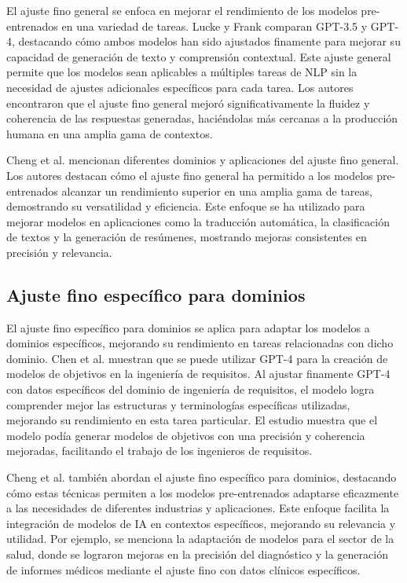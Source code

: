 El ajuste fino general se enfoca en mejorar el rendimiento de los modelos pre-entrenados en una variedad de tareas. Lucke y Frank \cite{Lucke2024} comparan GPT-3.5 y GPT-4, destacando cómo ambos modelos han sido ajustados finamente para mejorar su capacidad de generación de texto y comprensión contextual. Este ajuste general permite que los modelos sean aplicables a múltiples tareas de NLP sin la necesidad de ajustes adicionales específicos para cada tarea. Los autores encontraron que el ajuste fino general mejoró significativamente la fluidez y coherencia de las respuestas generadas, haciéndolas más cercanas a la producción humana en una amplia gama de contextos.

Cheng et al. \cite{Cheng2023} mencionan diferentes dominios y aplicaciones del ajuste fino general. Los autores destacan cómo el ajuste fino general ha permitido a los modelos pre-entrenados alcanzar un rendimiento superior en una amplia gama de tareas, demostrando su versatilidad y eficiencia. Este enfoque se ha utilizado para mejorar modelos en aplicaciones como la traducción automática, la clasificación de textos y la generación de resúmenes, mostrando mejoras consistentes en precisión y relevancia.

\subsection{Ajuste fino específico para dominios}

El ajuste fino específico para dominios se aplica para adaptar los modelos a dominios específicos, mejorando su rendimiento en tareas relacionadas con dicho dominio. Chen et al. \cite{Chen2023} muestran que  se puede utilizar GPT-4 para la creación de modelos de objetivos en la ingeniería de requisitos. Al ajustar finamente GPT-4 con datos específicos del dominio de ingeniería de requisitos, el modelo logra comprender mejor las estructuras y terminologías específicas utilizadas, mejorando su rendimiento en esta tarea particular. El estudio muestra que el modelo podía generar modelos de objetivos con una precisión y coherencia mejoradas, facilitando el trabajo de los ingenieros de requisitos.

Cheng et al. \cite{Cheng2023} también abordan el ajuste fino específico para dominios, destacando cómo estas técnicas permiten a los modelos pre-entrenados adaptarse eficazmente a las necesidades de diferentes industrias y aplicaciones. Este enfoque facilita la integración de modelos de IA en contextos específicos, mejorando su relevancia y utilidad. Por ejemplo, se menciona la adaptación de modelos para el sector de la salud, donde se lograron mejoras en la precisión del diagnóstico y la generación de informes médicos mediante el ajuste fino con datos clínicos específicos.


